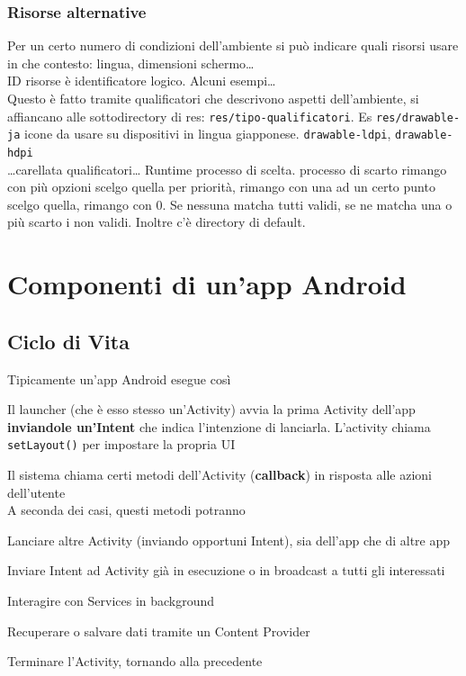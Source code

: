 \documentclass[10pt]{book}
\begin{document}
\subsection{Risorse alternative} Per un certo numero di condizioni dell'ambiente si può indicare quali risorsi usare in che contesto: lingua, dimensioni schermo\ldots\\
ID risorse è identificatore logico. Alcuni esempi\ldots\\
Questo è fatto tramite qualificatori che descrivono aspetti dell'ambiente, si affiancano alle sottodirectory di res: \texttt{res/tipo-qualificatori}. Es \texttt{res/drawable-ja} icone da usare su dispositivi in lingua giapponese. \texttt{drawable-ldpi}, \texttt{drawable-hdpi}\\
\ldots carellata qualificatori\ldots
Runtime processo di scelta.
processo di scarto rimango con più opzioni scelgo quella per priorità, rimango con una ad un certo punto scelgo quella, rimango con 0. Se nessuna matcha tutti validi, se ne matcha una o più scarto i non validi. Inoltre c'è directory di default.
\chapter{Componenti di un'app Android}
\section{Ciclo di Vita}
Tipicamente un'app Android esegue così
\begin{list}{}{}
	\item Il launcher (che è esso stesso un'Activity) avvia la prima Activity dell'app \textbf{inviandole un'Intent} che indica l'intenzione di lanciarla. L'activity chiama \texttt{setLayout()} per impostare la propria UI
	\item Il sistema chiama certi metodi dell'Activity (\textbf{callback}) in risposta alle azioni dell'utente\\
	A seconda dei casi, questi metodi potranno
	\begin{list}{}{}
		\item Lanciare altre Activity (inviando opportuni Intent), sia dell'app che di altre app
		\item Inviare Intent ad Activity già in esecuzione o in broadcast a tutti gli interessati
		\item Interagire con Services in background
		\item Recuperare o salvare dati tramite un Content Provider
		\item Terminare l'Activity, tornando alla precedente
	\end{list}
\end{list}
\end{document}
